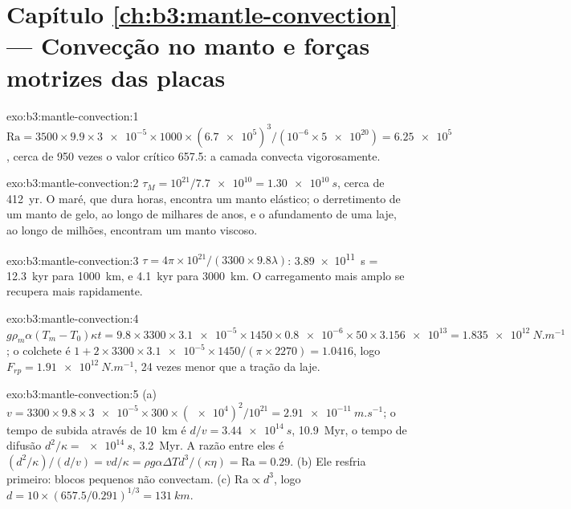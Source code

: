 \section*{Capítulo \ref{ch:b3:mantle-convection} --- Convecção no manto e forças motrizes das placas}

\begin{solution}{exo:b3:mantle-convection:1}
$\mathrm{Ra} = 3500\times9.9\times\num{3e-5}\times1000\times(\num{6.7e5})^3/
(10^{-6}\times\num{5e20}) = \num{6.25e5}$, cerca de 950 vezes o valor crítico
657.5: a camada convecta vigorosamente.
\end{solution}

\begin{solution}{exo:b3:mantle-convection:2}
$\tau_M = 10^{21}/\num{7.7e10} = \qty{1.30e10}{s}$, cerca de \qty{412}{yr}. O
maré, que dura horas, encontra um manto elástico; o derretimento de um manto de gelo,
ao longo de milhares de anos, e o afundamento de uma laje, ao longo de milhões, encontram um
manto viscoso.
\end{solution}

\begin{solution}{exo:b3:mantle-convection:3}
$\tau = 4\pi\times10^{21}/(3300\times9.8\lambda)$: \qty{3.89e11}{s} =
\qty{12.3}{kyr} para \qty{1000}{km}, e \qty{4.1}{kyr} para \qty{3000}{km}. O
carregamento mais amplo se recupera mais rapidamente.
\end{solution}

\begin{solution}{exo:b3:mantle-convection:4}
$g\rho_m\alpha(T_m - T_0)\kappa t = 9.8\times3300\times\num{3.1e-5}\times1450
\times\num{0.8e-6}\times50\times\num{3.156e13} = \qty{1.835e12}{N.m^{-1}}$; o
colchete é $1 + 2\times3300\times\num{3.1e-5}\times1450/(\pi\times2270) = 1.0416$,
logo $F_{rp} = \qty{1.91e12}{N.m^{-1}}$, 24 vezes menor que a tração da laje.
\end{solution}

\begin{solution}{exo:b3:mantle-convection:5}
(a) $v = 3300\times9.8\times\num{3e-5}\times300\times(\num{e4})^2/10^{21} =
\qty{2.91e-11}{m.s^{-1}}$; o tempo de subida através de \qty{10}{km} é $d/v =
\qty{3.44e14}{s}$, \qty{10.9}{Myr}, o tempo de difusão $d^2/\kappa =
\qty{e14}{s}$, \qty{3.2}{Myr}. A razão entre eles é $(d^2/\kappa)/(d/v) =
vd/\kappa = \rho g\alpha\Delta Td^3/(\kappa\eta) = \mathrm{Ra} = 0.29$. (b) Ele
resfria primeiro: blocos pequenos não convectam. (c) $\mathrm{Ra} \propto d^3$, logo $d =
10\times(657.5/0.291)^{1/3} = \qty{131}{km}$.
\end{solution}

